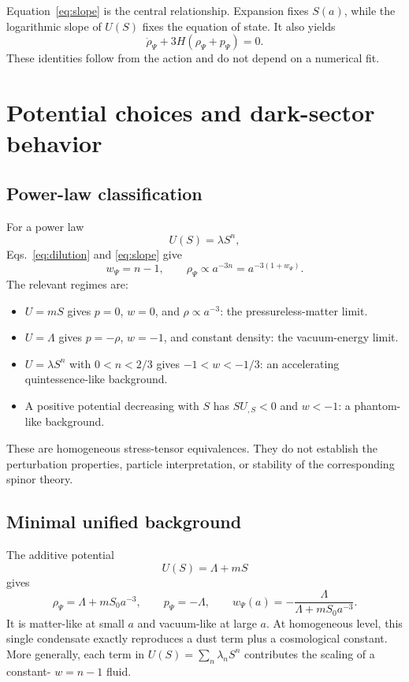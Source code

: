 \documentclass[11pt]{article}
\begin{document}
Equation~\eqref{eq:slope} is the central relationship.  Expansion fixes
$S(a)$, while the logarithmic slope of $U(S)$ fixes the equation of state.  It
also yields
\begin{equation}
  \dot\rho_\Psi+3H(\rho_\Psi+p_\Psi)=0.
\end{equation}
These identities follow from the action and do not depend on a numerical fit.

\section{Potential choices and dark-sector behavior}

\subsection{Power-law classification}

For a power law
\begin{equation}
  U(S)=\lambda S^n,
\end{equation}
Eqs.~\eqref{eq:dilution} and \eqref{eq:slope} give
\begin{equation}
  w_\Psi=n-1,
  \qquad
  \rho_\Psi\propto a^{-3n}=a^{-3(1+w_\Psi)}.
  \label{eq:powerlaw}
\end{equation}
The relevant regimes are:
\begin{itemize}
\item $U=mS$ gives $p=0$, $w=0$, and $\rho\propto a^{-3}$: the
pressureless-matter limit.
\item $U=\Lambda$ gives $p=-\rho$, $w=-1$, and constant density: the
vacuum-energy limit.
\item $U=\lambda S^n$ with $0<n<2/3$ gives
$-1<w<-1/3$: an accelerating quintessence-like background.
\item A positive potential decreasing with $S$ has $SU_{,S}<0$ and
$w<-1$: a phantom-like background.
\end{itemize}

These are homogeneous stress-tensor equivalences.  They do not establish the
perturbation properties, particle interpretation, or stability of the
corresponding spinor theory.

\subsection{Minimal unified background}

The additive potential
\begin{equation}
  U(S)=\Lambda+mS
  \label{eq:additive}
\end{equation}
gives
\begin{equation}
  \rho_\Psi=\Lambda+mS_0a^{-3},
  \qquad
  p_\Psi=-\Lambda,
  \qquad
  w_\Psi(a)=-\frac{\Lambda}{\Lambda+mS_0a^{-3}}.
  \label{eq:mixed}
\end{equation}
It is matter-like at small $a$ and vacuum-like at large $a$.  At homogeneous
level, this single condensate exactly reproduces a dust term plus a
cosmological constant.  More generally, each term in
$U(S)=\sum_n\lambda_nS^n$ contributes the scaling of a constant-
$w=n-1$ fluid.
\end{document}
